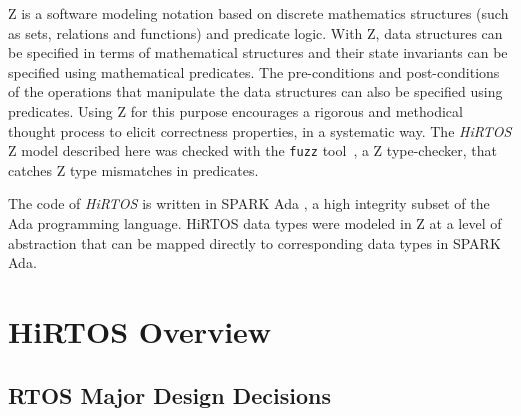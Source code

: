 \documentclass[11pt,letterpaper,twoside,openany]{book}
\begin{document}
Z is a software modeling notation based on discrete mathematics structures (such as sets,
relations and functions) and predicate logic. With Z, data structures can be specified in
terms of mathematical structures and their state invariants can be specified using mathematical
predicates. The pre-conditions and post-conditions of the operations that manipulate
the data structures can also be specified using predicates. Using Z for this purpose encourages
a rigorous and methodical thought process to elicit correctness properties, in a systematic way.
The \emph{HiRTOS} Z model described here was checked with the \verb'fuzz' tool~\cite{Fuzz}, a
Z type-checker, that catches Z type mismatches in predicates.

The code of \emph{HiRTOS} is written in SPARK Ada \cite{SparkAda}, a high integrity
subset of the Ada programming language. HiRTOS data types were modeled in Z at a level of
abstraction that can be mapped directly to corresponding data types in SPARK Ada.

\chapter{HiRTOS Overview}

\section{RTOS Major Design Decisions}
\end{document}
